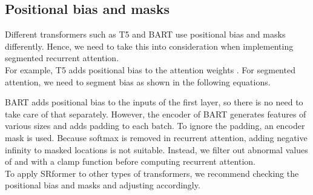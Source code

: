 \documentclass[11pt]{article}
\begin{document}
\subsection{Positional bias and masks}
\label{positionbias}
Different transformers such as T5 and BART use positional bias and masks differently. Hence, we need to take this into consideration when implementing segmented recurrent attention.\\
For example, T5 adds positional bias to the attention weights . For segmented attention, we need to segment bias as shown in the following equations.

BART adds positional bias to the inputs of the first layer, so there is no need to take care of that separately. However, the encoder of BART generates features of various sizes and adds padding to each batch. To ignore the padding, an encoder mask is used. Because softmax is removed in recurrent attention, adding negative infinity to masked locations is not suitable. Instead, we filter out abnormal values of  and  with a clamp function before computing recurrent attention.\\
To apply SRformer to other types of transformers, we recommend checking the positional bias and masks and adjusting accordingly.
\end{document}
